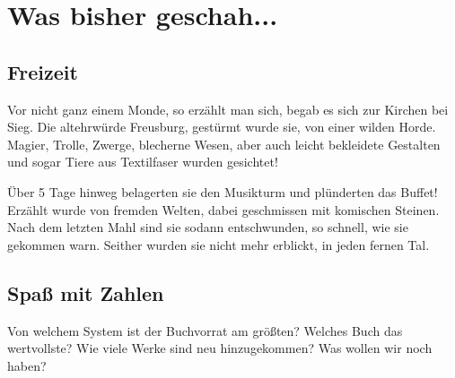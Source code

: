 
%



\usepackage{enumitem}
\usepackage{cancel}









%



\makemultititle
%

\section{Was bisher geschah...}

\subsection{Freizeit}
Vor nicht ganz einem Monde, so erzählt man sich, begab es sich zur Kirchen bei Sieg.
Die altehrwürde Freusburg, gestürmt wurde sie, von einer wilden Horde.
Magier, Trolle, Zwerge, blecherne Wesen, aber auch leicht bekleidete Gestalten und sogar Tiere aus Textilfaser wurden gesichtet!

Über 5 Tage hinweg belagerten sie den Musikturm und plünderten das Buffet!
Erzählt wurde von fremden Welten, dabei geschmissen mit komischen Steinen.
Nach dem letzten Mahl sind sie sodann entschwunden, so schnell, wie sie gekommen warn.
Seither wurden sie nicht mehr erblickt, in jeden fernen Tal.

\subsection{Spaß mit Zahlen}
Von welchem System ist der Buchvorrat am größten?
Welches Buch das wertvollste?
Wie viele Werke sind neu hinzugekommen?
Was wollen wir noch haben?

